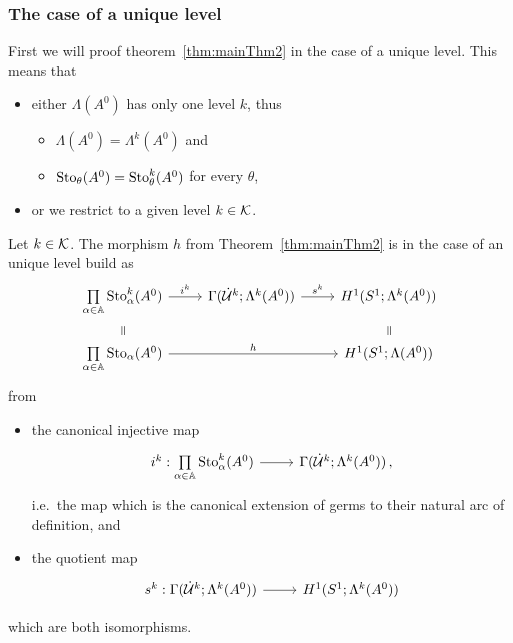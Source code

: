 \subsubsection{The case of a unique level}
First we will proof theorem~\ref{thm:mainThm2} in the case of a unique level.
This means that
\begin{itemize}
  \item either $\Lambda(A^0)$ has only one level $k$, thus
    \begin{itemize}
      \item $\Lambda(A^0)=\Lambda^k(A^0)$ and
      \item $\operatorname{Sto}_\theta(A^0)=\operatorname{Sto}_\theta^k(A^0)$ for every $\theta$,
    \end{itemize}
  \item or we restrict to a given level $k\in\mathcal{K}$.
\end{itemize}
\begin{lem}
  Let $k\in\mathcal{K}$.
  The morphism $h$ from Theorem~\ref{thm:mainThm2} is in the case of an unique
  level build as
  \[ \begin{tikzcd}[row sep=0cm]
    \underset{\alpha\in\A}\prod\Sto_\alpha^k(A^0)
    \rar{i^k}
    & \Gamma(\dot\cU^k;\Lambda^k(A^0))
    \rar{s^k}
    & H^1(S^1;\Lambda^k(A^0))
    \\
    \text{\rotatebox[origin=c]{-90}{$=$}}
    &&
    \text{\rotatebox[origin=c]{-90}{$=$}}
    \\
    \underset{\alpha\in\A}\prod\Sto_\alpha(A^0)
    \arrow{rr}{h}
    &
    & H^1(S^1;\Lambda(A^0))
  \end{tikzcd} \]
  from
  \begin{itemize}
    \item the canonical injective map
      \[ \begin{tikzcd}
        i^k:\underset{\alpha\in\A}\prod\Sto_\alpha^k(A^0) \rar&
        \Gamma(\dot\cU^k;\Lambda^k(A^0)) \,,
      \end{tikzcd} \]
      i.e.\ the map which is the canonical extension of germs to their natural
      arc of definition, and
    \item the quotient map
      \[ \begin{tikzcd}
        s^k:\Gamma(\dot\cU^k;\Lambda^k(A^0)) \rar& H^1(S^1;\Lambda^k(A^0))
      \end{tikzcd} \]
  \end{itemize}
  which are both isomorphisms.
\end{lem}
